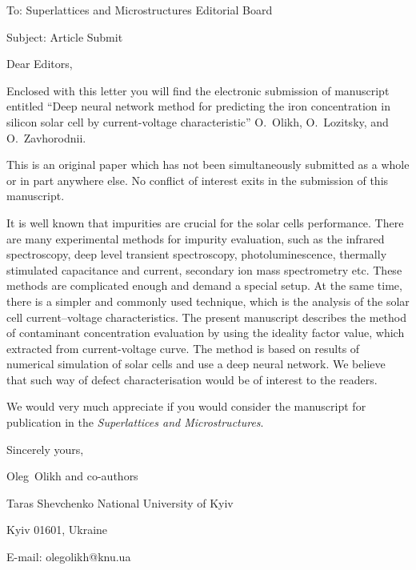 \documentclass[preprint]{elsarticle}
\begin{document}
To:
Superlattices and Microstructures Editorial Board


Subject:
Article Submit

\vspace{5mm}
Dear Editors,

\vspace{3mm}
Enclosed with this letter you will find the electronic submission of manuscript entitled
``Deep neural network method for predicting the iron concentration in silicon solar cell by current-voltage characteristic'' O.~Olikh, O.~Lozitsky, and O.~Zavhorodnii.



This is an original paper which has not been simultaneously submitted as a whole or in part anywhere else.
No conflict of interest exits in the submission of this manuscript.


It is well known that impurities are crucial for the solar cells performance.
There are many experimental methods for impurity evaluation, such as the infrared spectroscopy, deep level transient spectroscopy, photoluminescence, thermally stimulated capacitance and current, secondary ion mass spectrometry etc.
These methods are complicated enough and demand a special setup.
At the same time, there is a simpler and commonly used technique, which
is the analysis of the solar cell current--voltage characteristics.
The present manuscript describes the method of contaminant concentration evaluation by
using the ideality factor value, which extracted from current-voltage curve.
The method is based on results of numerical simulation of solar cells and use a deep neural network. 
We believe that such way of defect characterisation would be of interest to the readers.

We would  very much appreciate if you would consider the manuscript for publication in the \emph{Superlattices and Microstructures}.

\vspace{3mm}

Sincerely yours,

Oleg~Olikh and co-authors


Taras Shevchenko National University of Kyiv


Kyiv 01601, Ukraine

E-mail: olegolikh@knu.ua


\end{document}

